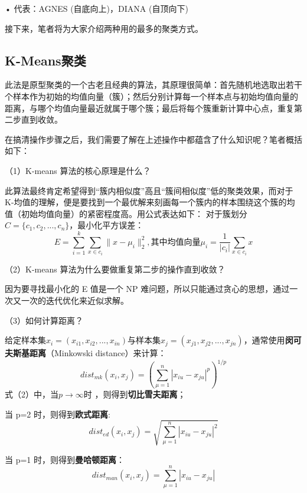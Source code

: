 • 代表：AGNES (自底向上)，DIANA (自顶向下)
\newline %

接下来，笔者将为大家介绍两种用的最多的聚类方式。
\subsection{K-Means聚类}
此法是原型聚类的一个古老且经典的算法，其原理很简单：首先随机地选取出若干个样本作为初始的均值向量（簇）；然后分别计算每一个样本点与初始均值向量的距离，与哪个均值向量最近就属于哪个簇；最后将每个簇重新计算中心点，重复第二步直到收敛。

在搞清操作步骤之后，我们需要了解在上述操作中都蕴含了什么知识呢？笔者概括如下：

（1）K-means 算法的核心原理是什么？

此算法最终肯定希望得到“簇内相似度”高且“簇间相似度”低的聚类效果，而对于 K-均值的理解，便是要找到一个最优解来刻画每一个簇内的样本围绕这个簇的均值（初始均值向量）的紧密程度高。用公式表达如下：
对于簇划分$C=\{c_{1},c_{2},...,c_{n}\}$，最小化平方误差：
\setcounter{equation}{0} %
\begin{equation}E=\sum_{i=1}^k\sum_{x\in c_i}\|x-\mu_i\|_2^2,\text{其中均值向量}\mu_i=\frac{1}{|c_i|}\sum_{x\in c_i}x\end{equation}

（2）K-means 算法为什么要做重复第二步的操作直到收敛？

因为要寻找最小化的 E 值是一个 NP 难问题，所以只能通过贪心的思想，通过一次又一次的迭代优化来近似求解。

（3）如何计算距离？

给定样本集$x_{i}=(x_{i1},x_{i2},...,x_{in})$与样本集$x_{j}=(x_{j1},x_{j2},...,x_{jn})$，通常使用\textbf{闵可夫斯基距离}（Minkowski distance）来计算：
\begin{equation}dist_{mk}(x_i,x_j)=(\sum_{\mu=1}^n\left|x_{iu}-x_{ju}\right|^p)^{1/p}\end{equation}
式（2）中，当$p\to\infty $时 ，则得到\textbf{切比雪夫距离}；

当 p=2 时，则得到\textbf{欧式距离}:
\begin{equation}dist_{ed}(x_i,x_j)=\sqrt{\sum_{\mu=1}^n\left|x_{iu}-x_{ju}\right|^2}\end{equation}

当 p=1 时，则得到\textbf{曼哈顿距离}：
\begin{equation}dist_{man}(x_i,x_j)=\sum_{\mu=1}^n\left|x_{iu}-x_{ju}\right|\end{equation}

